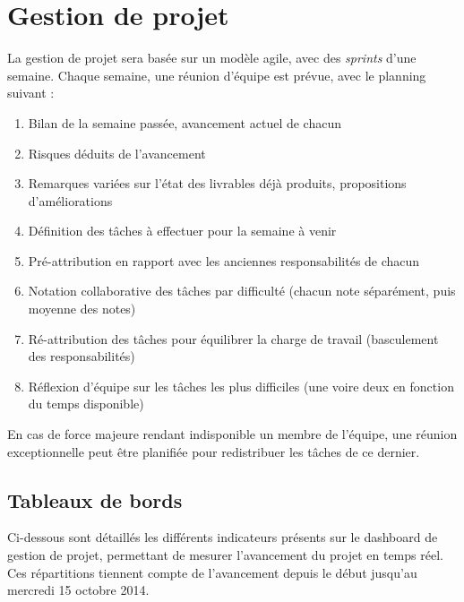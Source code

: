 \section{Gestion de projet}

La gestion de projet sera basée sur un modèle agile, avec des \textit{sprints}
d'une semaine. Chaque semaine, une réunion d'équipe est prévue, avec le
planning suivant :

\begin{enumerate}
    \item Bilan de la semaine passée, avancement actuel de chacun
    \item Risques déduits de l'avancement
    \item Remarques variées sur l'état des livrables déjà produits,
        propositions d'améliorations
    \item Définition des tâches à effectuer pour la semaine à venir
    \item Pré-attribution en rapport avec les anciennes responsabilités de
        chacun
    \item Notation collaborative des tâches par difficulté (chacun note
        séparément, puis moyenne des notes)
    \item Ré-attribution des tâches pour équilibrer la charge de travail
        (basculement des responsabilités)
    \item Réflexion d'équipe sur les tâches les plus difficiles (une voire deux
        en fonction du temps disponible)
\end{enumerate}

En cas de force majeure rendant indisponible un membre de l'équipe, une réunion
exceptionnelle peut être planifiée pour redistribuer les tâches de ce dernier.

\subsection{Tableaux de bords}

Ci-dessous sont détaillés les différents indicateurs présents sur le dashboard
de gestion de projet, permettant de mesurer l'avancement du projet en temps
réel. Ces répartitions tiennent compte de l'avancement depuis le début jusqu'au
mercredi 15 octobre 2014.

